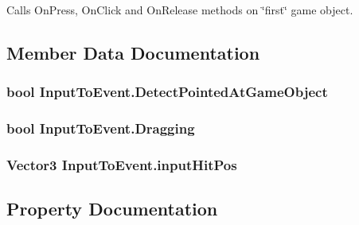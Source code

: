Calls On\+Press, On\+Click and On\+Release methods on \char`\"{}first\char`\"{} game object. 

\subsection{Member Data Documentation}
\subsubsection[{\texorpdfstring{Detect\+Pointed\+At\+Game\+Object}{DetectPointedAtGameObject}}]{\setlength{\rightskip}{0pt plus 5cm}bool Input\+To\+Event.\+Detect\+Pointed\+At\+Game\+Object}\hypertarget{class_input_to_event_ae4f958f81632ea46ce83ef9ae8801b69}{}\label{class_input_to_event_ae4f958f81632ea46ce83ef9ae8801b69}
\subsubsection[{\texorpdfstring{Dragging}{Dragging}}]{\setlength{\rightskip}{0pt plus 5cm}bool Input\+To\+Event.\+Dragging}\hypertarget{class_input_to_event_a7962fc265dae0897c0d703a4ddabf466}{}\label{class_input_to_event_a7962fc265dae0897c0d703a4ddabf466}
\subsubsection[{\texorpdfstring{input\+Hit\+Pos}{inputHitPos}}]{\setlength{\rightskip}{0pt plus 5cm}Vector3 Input\+To\+Event.\+input\+Hit\+Pos\hspace{0.3cm}{\ttfamily [static]}}\hypertarget{class_input_to_event_afed01280ab0eb13db78bf20e6ddc8110}{}\label{class_input_to_event_afed01280ab0eb13db78bf20e6ddc8110}


\subsection{Property Documentation}
